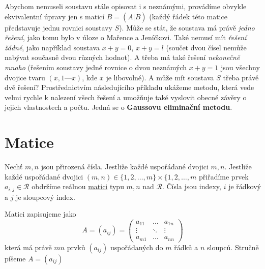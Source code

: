 {      Abychom nemuseli soustavu stále opisovat i s neznámými, provádíme obvykle ekvivalentní 
      úpravy jen s maticí \(B = (A|\overline{B})\) (každý řádek této matice představuje jednu 
      rovnici soustavy \(S\)). Může se stát, že soustava má právě \emph{jedno řešení}, jako tomu 
      bylo v  úloze o Mařence a Jeníčkovi. Také nemusí mít \emph{řešení žádné}, jako například 
      soustava \(x + y = 0\), \(x + y = l\) (součet dvou čísel nemůže nabývat současně dvou různých 
      hodnot). A třeba má také řešení \emph{nekonečně mnoho} (řešením soustavy jedné rovnice o dvou 
      neznámých \(x + y = 1\) jsou všechny dvojice tvaru \((x, 1 — x)\), kde \(x\) je libovolné). A 
      může mít soustava \(S\) třeba právě dvě řešení? Prostřednictvím následujícího příkladu 
      ukážeme metodu, která vede velmi rychle k nalezení všech řešení a umožňuje také vyslovit 
      obecné závěry o jejich vlastnostech a počtu. Jedná se o \textbf{Gaussovu eliminační metodu}.
      
 
  \section{Matice}\label{MAI:sec_matice}
    \begin{definition}\label{def_matice}
      Nechť \(m, n\) jsou přirozená čísla. Jestliže každé uspořádané dvojici \(m,n\). Jestliže každé
      uspořádané dvojici \((m,n)\in \{1,2,\ldots,m\}\times \{1,2,\ldots,m\) přiřadíme prvek
      \(a_{i,j}\in\mathcal{R}\) obdržíme reálnou \href{http://cs.wikipedia.org/wiki/Matice}{matici} 
      typu \(m,n\) nad \(\mathcal{R}\). Čísla jsou indexy, \(i\) je řádkový a \(j\) je sloupcový 
      index.
      
      Matici zapisujeme jako
      \begin{equation}\label{matice_zapis}
        A = \left(a_{ij}\right) =\left(
          \begin{array}{ccc}
            a_{11} & \ldots & a_{1n} \\
            \vdots & \ddots & \vdots \\
            a_{m1} & \ldots & a_{nn}
          \end{array}
        \right)
      \end{equation}
      která má právě \(mn\) prvků \((a_{ij})\) uspořádaných do \(m\) řádků a \(n\) sloupců. Stručně 
      píšeme \(A = (a_{ij})\)
    \end{definition}
  
}
